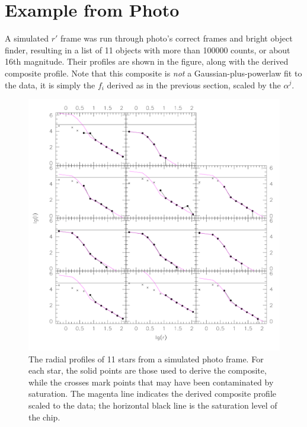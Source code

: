 \documentclass[12pt]{article}
\begin{document}
\section{Example from Photo}

A simulated $r'$ frame was run through photo's correct frames and bright
object finder, resulting in a list of 11 objects with more than 100000 counts,
or about 16th magnitude. Their profiles are shown in the figure, along
with the derived composite profile. Note that this composite is {\em not}
a Gaussian-plus-powerlaw fit to the data, it is simply the $f_i$ derived
as in the previous section, scaled by the $\alpha^j$.

\begin{figure}
\begin{center}
\includegraphics[width=6in]{composite_star}
\end{center}
\caption{The radial profiles of 11 stars from a simulated photo frame.
For each star, the solid points are those used to derive the composite,
while the crosses mark points that may have been contaminated by saturation.
The magenta line indicates the derived composite profile scaled to the
data; the horizontal black line is the saturation level of the chip.
}
\end{figure}
\end{document}
